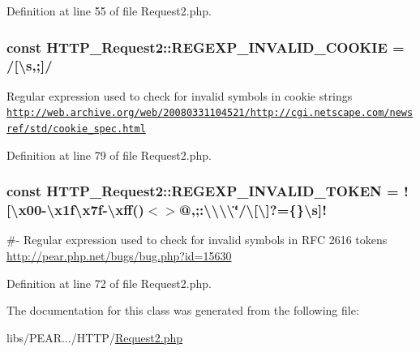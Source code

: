 Definition at line 55 of file Request2.\+php.

\subsubsection[{\texorpdfstring{R\+E\+G\+E\+X\+P\+\_\+\+I\+N\+V\+A\+L\+I\+D\+\_\+\+C\+O\+O\+K\+IE}{REGEXP_INVALID_COOKIE}}]{\setlength{\rightskip}{0pt plus 5cm}const H\+T\+T\+P\+\_\+\+Request2\+::\+R\+E\+G\+E\+X\+P\+\_\+\+I\+N\+V\+A\+L\+I\+D\+\_\+\+C\+O\+O\+K\+IE = \textquotesingle{}/\mbox{[}\textbackslash{}{\bf s},;\mbox{]}/\textquotesingle{}}\hypertarget{classHTTP__Request2_ab7fc574a0035ac8e940f6cd3456b0c28}{}\label{classHTTP__Request2_ab7fc574a0035ac8e940f6cd3456b0c28}
Regular expression used to check for invalid symbols in cookie strings \hyperlink{}{\href{http://web.archive.org/web/20080331104521/http://cgi.netscape.com/newsref/std/cookie_spec.html}{\tt http\+://web.\+archive.\+org/web/20080331104521/http\+://cgi.\+netscape.\+com/newsref/std/cookie\+\_\+spec.\+html} }

Definition at line 79 of file Request2.\+php.

\subsubsection[{\texorpdfstring{R\+E\+G\+E\+X\+P\+\_\+\+I\+N\+V\+A\+L\+I\+D\+\_\+\+T\+O\+K\+EN}{REGEXP_INVALID_TOKEN}}]{\setlength{\rightskip}{0pt plus 5cm}const H\+T\+T\+P\+\_\+\+Request2\+::\+R\+E\+G\+E\+X\+P\+\_\+\+I\+N\+V\+A\+L\+I\+D\+\_\+\+T\+O\+K\+EN = \textquotesingle{}!\mbox{[}\textbackslash{}x00-\/\textbackslash{}x1f\textbackslash{}x7f-\/\textbackslash{}xff()$<$$>$@,;\+:\textbackslash{}\textbackslash{}\textbackslash{}\textbackslash{}\char`\"{}/\textbackslash{}\mbox{[}\textbackslash{}\mbox{]}?=\{\}\textbackslash{}s\mbox{]}!\textquotesingle{}}\hypertarget{classHTTP__Request2_a73691a6fc7003599b47be20a8c728bbf}{}\label{classHTTP__Request2_a73691a6fc7003599b47be20a8c728bbf}
\#-\/ Regular expression used to check for invalid symbols in R\+FC 2616 tokens \hyperlink{}{http\+://pear.\+php.\+net/bugs/bug.\+php?id=15630}

Definition at line 72 of file Request2.\+php.



The documentation for this class was generated from the following file\+:\begin{DoxyCompactItemize}
\item 
libs/\+P\+E\+A\+R.../\+H\+T\+T\+P/\hyperlink{Request2_8php}{Request2.\+php}\end{DoxyCompactItemize}
